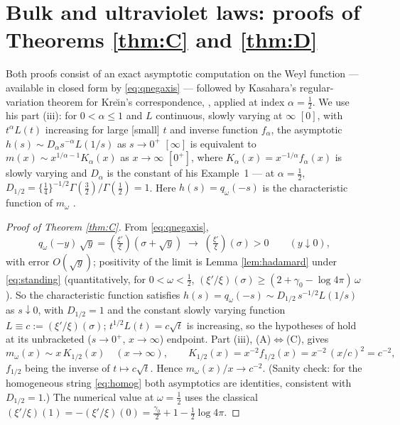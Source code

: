 \documentclass[11pt,reqno]{amsart}
\theoremstyle{plain}
\theoremstyle{definition}
\newcommand{\lxi}[1]{\left(\tfrac{\xi'}{\xi}\right)\!#1}
\begin{document}
\section{Bulk and ultraviolet laws: proofs of Theorems \ref{thm:C} and \ref{thm:D}}
\label{sec:thmCD}

Both proofs consist of an exact asymptotic computation on the Weyl function --- available in
closed form by \eqref{eq:qnegaxis} --- followed by Kasahara's regular-variation theorem for
Kre\u\i n's correspondence, \cite[Thm.~2]{Kasahara}, applied at index $\alpha=\tfrac12$. We
use his part (iii): for $0<\alpha\le1$ and $L$ continuous, slowly varying at $\infty$ $[0]$,
with $t^\alpha L(t)$ increasing for large [small] $t$ and inverse function $f_\alpha$, the
asymptotic $h(s)\sim D_\alpha s^{-\alpha}L(1/s)$ as $s\to0^+$ $[\infty]$ is equivalent to
$m(x)\sim x^{1/\alpha-1}K_\alpha(x)$ as $x\to\infty$ $[0^+]$, where
$K_\alpha(x)=x^{-1/\alpha}f_\alpha(x)$ is slowly varying and $D_\alpha$ is the constant of his
Example~1 --- at $\alpha=\tfrac12$, $D_{1/2}=\{\tfrac14\}^{-1/2}\Gamma(\tfrac32)/\Gamma(\tfrac12)=1$.
Here $h(s)=q_\omega(-s)$ is the characteristic function of $m_\omega$ \cite[(5),(7)]{Kasahara}.

\begin{proof}[Proof of Theorem \ref{thm:C}]
From \eqref{eq:qnegaxis},
\[
  q_\omega(-y)\,\sqrt y=\lxi{(\sigma+\sqrt y)}
  \;\longrightarrow\;\lxi{(\sigma)}>0\qquad(y\downarrow0),
\]
with error $O(\sqrt y)$; positivity of the limit is Lemma \ref{lem:hadamard} under
\eqref{eq:standing} (quantitatively, for $0<\omega<\tfrac12$,
$(\xi'/\xi)(\sigma)\ge(2+\gamma_0-\log4\pi)\,\omega$ \cite[Cor.~3.1]{Margin}). So the
characteristic function satisfies $h(s)=q_\omega(-s)\sim D_{1/2}\,s^{-1/2}L(1/s)$ as
$s\downarrow0$, with $D_{1/2}=1$ and the constant slowly varying function
$L\equiv c:=(\xi'/\xi)(\sigma)$; $t^{1/2}L(t)=c\sqrt t$ is increasing, so the hypotheses of
\cite[Thm.~2]{Kasahara} hold at its unbracketed ($s\to0^+$, $x\to\infty$) endpoint. Part
(iii), (A)$\Leftrightarrow$(C), gives
\[
  m_\omega(x)\sim x\,K_{1/2}(x)\quad(x\to\infty),
  \qquad
  K_{1/2}(x)=x^{-2}f_{1/2}(x)=x^{-2}\,(x/c)^2=c^{-2},
\]
$f_{1/2}$ being the inverse of $t\mapsto c\sqrt t$. Hence $m_\omega(x)/x\to c^{-2}$. (Sanity
check: for the homogeneous string \eqref{eq:homog} both asymptotics are identities, consistent
with $D_{1/2}=1$.) The numerical value at $\omega=\tfrac12$ uses the classical
$(\xi'/\xi)(1)=-(\xi'/\xi)(0)=\tfrac{\gamma_0}2+1-\tfrac12\log4\pi$.
\end{proof}
\end{document}
